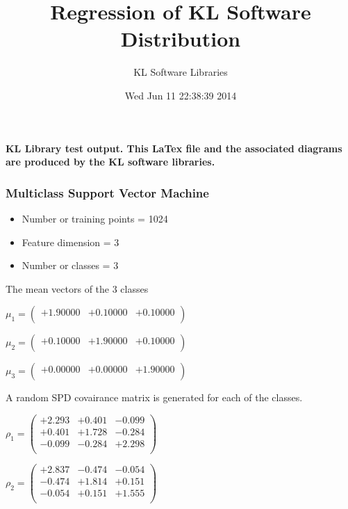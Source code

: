 \documentclass[9pt]{article}
\theoremstyle{plain}
\theoremstyle{definition}
\theoremstyle{remark}
\numberwithin{equation}{section}
\begin{document}
\title{Regression of KL Software Distribution   }
\author{KL Software Libraries}
\date{Wed Jun 11 22:38:39 2014
}
\maketitle
\textbf{ KL Library test output.  This LaTex file and the associated diagrams are produced by the KL software libraries.}
\subsubsection{Multiclass Support Vector Machine }
\begin{itemize}
\item Number or training points = 1024
\item Feature dimension = 3
\item Number or classes = 3
\end{itemize}
{The mean vectors of the 3 classes}

$\mu_1 = \left(
\begin{array}{
ccc}
+1.90000 & +0.10000 & +0.10000 \\
\end{array}
\right)$ \newline 

$\mu_2 = \left(
\begin{array}{
ccc}
+0.10000 & +1.90000 & +0.10000 \\
\end{array}
\right)$ \newline 

$\mu_3 = \left(
\begin{array}{
ccc}
+0.00000 & +0.00000 & +1.90000 \\
\end{array}
\right)$ \newline 

A random SPD covairance matrix is generated for each of the classes.\newline

$\rho_1 = \left(
\begin{array}{
ccc}
+2.293 & +0.401 & -0.099 \\
+0.401 & +1.728 & -0.284 \\
-0.099 & -0.284 & +2.298 \\
\end{array}
\right)$ \newline 

$\rho_2 = \left(
\begin{array}{
ccc}
+2.837 & -0.474 & -0.054 \\
-0.474 & +1.814 & +0.151 \\
-0.054 & +0.151 & +1.555 \\
\end{array}
\right)$ \newline 
\end{document}
